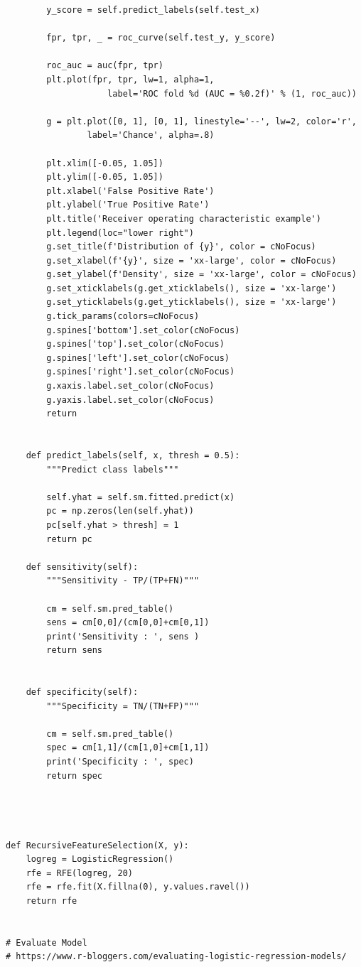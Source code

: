 \begin{verbatim}
        y_score = self.predict_labels(self.test_x)

        fpr, tpr, _ = roc_curve(self.test_y, y_score)

        roc_auc = auc(fpr, tpr)
        plt.plot(fpr, tpr, lw=1, alpha=1,
                    label='ROC fold %d (AUC = %0.2f)' % (1, roc_auc))

        g = plt.plot([0, 1], [0, 1], linestyle='--', lw=2, color='r',
                label='Chance', alpha=.8)

        plt.xlim([-0.05, 1.05])
        plt.ylim([-0.05, 1.05])
        plt.xlabel('False Positive Rate')
        plt.ylabel('True Positive Rate')
        plt.title('Receiver operating characteristic example')
        plt.legend(loc="lower right")
        g.set_title(f'Distribution of {y}', color = cNoFocus)
        g.set_xlabel(f'{y}', size = 'xx-large', color = cNoFocus)
        g.set_ylabel(f'Density', size = 'xx-large', color = cNoFocus)
        g.set_xticklabels(g.get_xticklabels(), size = 'xx-large')
        g.set_yticklabels(g.get_yticklabels(), size = 'xx-large')
        g.tick_params(colors=cNoFocus)
        g.spines['bottom'].set_color(cNoFocus)
        g.spines['top'].set_color(cNoFocus)
        g.spines['left'].set_color(cNoFocus)
        g.spines['right'].set_color(cNoFocus)
        g.xaxis.label.set_color(cNoFocus)
        g.yaxis.label.set_color(cNoFocus)
        return


    def predict_labels(self, x, thresh = 0.5):
        """Predict class labels"""

        self.yhat = self.sm.fitted.predict(x)
        pc = np.zeros(len(self.yhat))
        pc[self.yhat > thresh] = 1
        return pc

    def sensitivity(self):
        """Sensitivity - TP/(TP+FN)"""

        cm = self.sm.pred_table()
        sens = cm[0,0]/(cm[0,0]+cm[0,1])
        print('Sensitivity : ', sens )
        return sens


    def specificity(self):
        """Specificity = TN/(TN+FP)"""

        cm = self.sm.pred_table()
        spec = cm[1,1]/(cm[1,0]+cm[1,1])
        print('Specificity : ', spec)
        return spec




def RecursiveFeatureSelection(X, y):
    logreg = LogisticRegression()
    rfe = RFE(logreg, 20)
    rfe = rfe.fit(X.fillna(0), y.values.ravel())
    return rfe


# Evaluate Model
# https://www.r-bloggers.com/evaluating-logistic-regression-models/




\end{verbatim}
